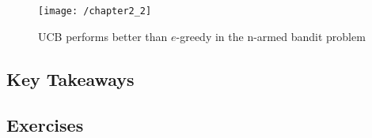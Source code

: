 \begin{figure}[h!]
	\centering
	\texttt{[image: /chapter2\_2]}
	\caption{UCB performs better than \(e\)-greedy in the n-armed bandit problem}
	\label{fig:chapter2_2}
\end{figure}

\subsection{Key Takeaways}

\subsection{Exercises}
